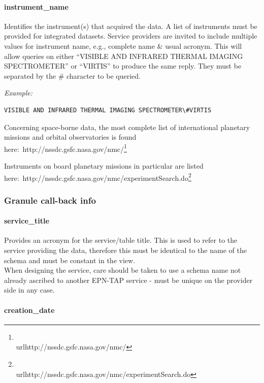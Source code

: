 \documentclass[11pt,a4paper]{ivoa}
\begin{document}
\paragraph{instrument\_name}

Identifies the instrument(s) that acquired the data. A list of instruments must be provided for integrated datasets. Service providers are invited to include multiple values for instrument name, e.g., complete name \& usual acronym. This will allow queries on either ``VISIBLE AND INFRARED THERMAL IMAGING SPECTROMETER'' or ``VIRTIS'' to produce the same reply. They must be separated by the \# character to be queried.

\emph{\emph{Example:}}






\begin{verbatim}VISIBLE AND INFRARED THERMAL IMAGING SPECTROMETER\#VIRTIS\end{verbatim}




Concerning space-borne data, the most complete list of international planetary missions and orbital observatories is found here: http://nssdc.gsfc.nasa.gov/nmc/\footnote{\\url{http://nssdc.gsfc.nasa.gov/nmc/}}

Instruments on board planetary missions in particular are listed here: http://nssdc.gsfc.nasa.gov/nmc/experimentSearch.do\footnote{\\url{http://nssdc.gsfc.nasa.gov/nmc/experimentSearch.do}}

\subsubsection{Granule call-back info}

\paragraph{service\_title}

Provides an acronym for the service/table title. This is used to refer to the service providing the data, therefore this must be identical to the name of the schema and must be constant in the view.\\When designing the service, care should be taken to use a schema name not already ascribed to another EPN-TAP service - must be unique on the provider side in any case.

\paragraph{creation\_date}
\end{document}
